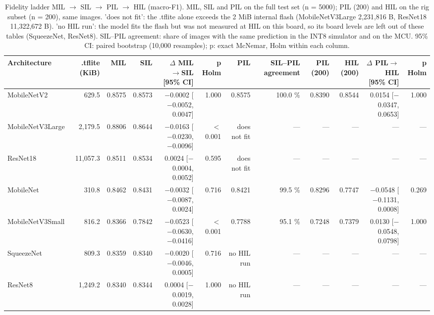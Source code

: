 
\begin{table}[htbp]
\centering
\scriptsize
\caption{Fidelity ladder MIL $\rightarrow$ SIL $\rightarrow$ PIL $\rightarrow$ HIL (macro-F1). MIL, SIL and PIL on the full test set (n = 5000); PIL (200) and HIL on the rig subset (n = 200), same images. 'does not fit': the .tflite alone exceeds the 2 MiB internal flash (MobileNetV3Large 2,231,816 B, ResNet18 11,322,672 B). 'no HIL run': the model fits the flash but was not measured at HIL on this board, so its board levels are left out of these tables (SqueezeNet, ResNet8). SIL--PIL agreement: share of images with the same prediction in the INT8 simulator and on the MCU. 95\% CI: paired bootstrap (10,000 resamples); p: exact McNemar, Holm within each column.}
\label{tab:ladder-coco-niclavision-1}
\begin{tabular}{lrrrrrrrrrrr}
\toprule
Architecture & .tflite (KiB) & MIL & SIL & $\Delta$ MIL$\rightarrow$SIL [95\% CI] & p Holm & PIL & SIL--PIL agreement & PIL (200) & HIL (200) & $\Delta$ PIL$\rightarrow$HIL [95\% CI] & p Holm \\
\midrule
MobileNetV2 & 629.5 & 0.8575 & 0.8573 & $-$0.0002 [$-$0.0052, 0.0047] & 1.000 & 0.8575 & 100.0 \% & 0.8390 & 0.8544 & 0.0154 [$-$0.0347, 0.0653] & 1.000 \\
MobileNetV3Large & 2,179.5 & 0.8806 & 0.8644 & $-$0.0163 [$-$0.0230, $-$0.0096] & $<$0.001 & does not fit & --- & --- & --- & --- & --- \\
ResNet18 & 11,057.3 & 0.8511 & 0.8534 & 0.0024 [$-$0.0004, 0.0052] & 0.595 & does not fit & --- & --- & --- & --- & --- \\
MobileNet & 310.8 & 0.8462 & 0.8431 & $-$0.0032 [$-$0.0087, 0.0024] & 0.716 & 0.8421 & 99.5 \% & 0.8296 & 0.7747 & $-$0.0548 [$-$0.1131, 0.0008] & 0.269 \\
MobileNetV3Small & 816.2 & 0.8366 & 0.7842 & $-$0.0523 [$-$0.0630, $-$0.0416] & $<$0.001 & 0.7788 & 95.1 \% & 0.7248 & 0.7379 & 0.0130 [$-$0.0548, 0.0798] & 1.000 \\
SqueezeNet & 809.3 & 0.8359 & 0.8340 & $-$0.0020 [$-$0.0046, 0.0005] & 0.716 & no HIL run & --- & --- & --- & --- & --- \\
ResNet8 & 1,249.2 & 0.8340 & 0.8344 & 0.0004 [$-$0.0019, 0.0028] & 1.000 & no HIL run & --- & --- & --- & --- & --- \\
\bottomrule
\end{tabular}
\end{table}

